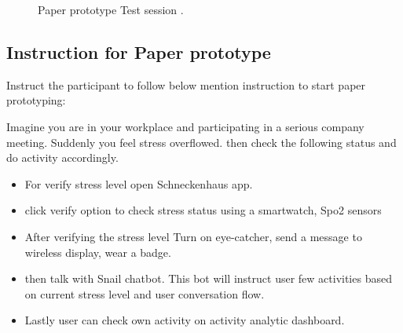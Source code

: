 \begin{figure}[hbt!] 
  \centering
  \qquad
    \qquad
  \caption[Paper prototype Test session ]{Paper prototype Test session .}
  \label{fig:Poster}
\end{figure}


\subsection*{Instruction for Paper prototype}

Instruct the participant to follow below mention instruction to start paper prototyping:

Imagine you are in your workplace and participating in a serious company meeting. Suddenly you feel stress overflowed. then check the following status and do activity accordingly.
\begin{itemize}
    \item For verify stress level open Schneckenhaus app. 
    \item click verify option to check stress status using a smartwatch, Spo2 sensors
    \item After verifying the stress level Turn on eye-catcher, send a message to wireless display, wear a badge.
    \item then talk with Snail chatbot. This bot will instruct user few activities based on current stress level and user conversation flow.
    \item Lastly user can check own activity on activity analytic dashboard.
\end{itemize}

